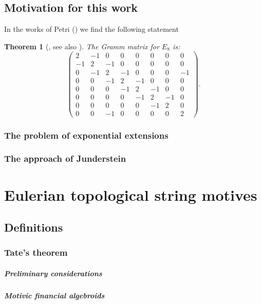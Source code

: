 \documentclass[12pt, oneside]{book}
\theoremstyle{plain}
\newtheorem{theorem}{Theorem}[section]
\theoremstyle{definition}
\begin{document}
\section{Motivation for this work}
In the works of Petri (\cite[Theorem 2.3]{Petri}) we find the following statement

\begin{theorem}[{\cite[Theorem 2.3]{Petri}, see also \cite[pg. 45]{BlackScholes}}]
The Gramm matrix for $E_8$ is:
$$
\begin{pmatrix}
2	&-1&0	&0	&0	&0	&0	&0\\
-1	&2	&-1	&0	&0	&0	&0	&0\\
0	&-1	&2	&-1	&0	&0	&0	&-1\\
0	&0	&-1	&2	&-1	&0	&0	&0\\
0	&0	&0	&-1	&2	&-1	&0	&0\\
0	&0	&0	&0	&-1	&2	&-1	&0\\
0	&0	&0	&0	&0	&-1	&2	&0\\
0	&0	&-1	&0	&0	&0	&0	&2
\end{pmatrix}.
$$
\end{theorem}

\subsection{The problem of exponential extensions}
\lipsum[23]
\subsection{The approach of Junderstein}
\lipsum[23]

\chapter{Eulerian topological string motives}
\lipsum[23]
\section{Definitions}
\lipsum[23]
\subsection{Tate's theorem}
\paragraph{Preliminary considerations}
\lipsum[23]
\paragraph{Motivic financial algebroids}
\lipsum[23]
\end{document}
